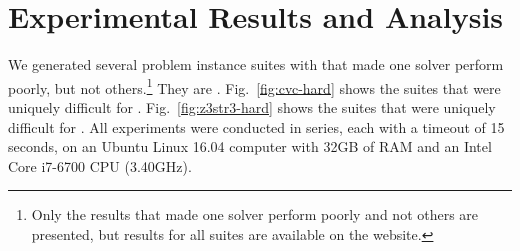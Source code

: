 \section{Experimental Results and Analysis}
\label{sec:data}

We generated several problem instance suites with \fuzzer{} that made one
solver perform poorly, but not others.\footnote{Only the
results that made one solver perform poorly and not others are presented, but
results for all \fuzzer{} suites are available on the \fuzzer{}
website\cite{website}.}
They are \theSuites{}. Fig.~\ref{fig:cvc-hard} shows the suites that were
uniquely difficult for \cvc{}. Fig.~\ref{fig:z3str3-hard} shows the
suites that were uniquely difficult for \us{}. All experiments were
conducted in series, each with a timeout of 15 seconds,
on an Ubuntu Linux 16.04 computer with 32GB of RAM and an
Intel\textregistered{} Core\texttrademark{} i7-6700 CPU (3.40GHz).
